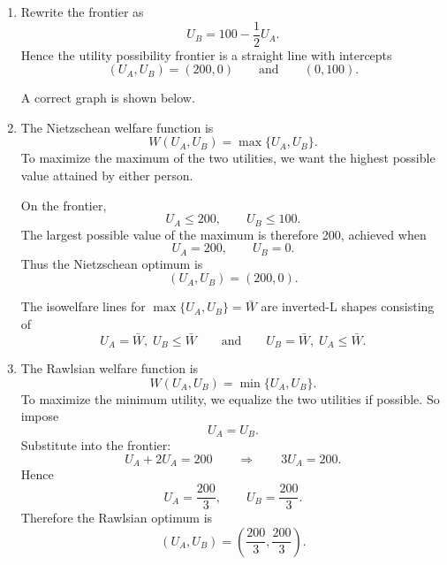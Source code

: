\documentclass[12pt]{article}
\begin{document}
\begin{enumerate}[label=(\alph*)]
    \item
    Rewrite the frontier as
    \[
    U_B = 100-\frac12 U_A.
    \]
    Hence the utility possibility frontier is a straight line with intercepts
    \[
    (U_A,U_B)=(200,0)
    \qquad\text{and}\qquad
    (0,100).
    \]

    A correct graph is shown below.

    \begin{center}
    \end{center}

    \item
    The Nietzschean welfare function is
    \[
    W(U_A,U_B)=\max\{U_A,U_B\}.
    \]
    To maximize the maximum of the two utilities, we want the highest possible value attained by either person.

    On the frontier,
    \[
    U_A\le 200,
    \qquad
    U_B\le 100.
    \]
    The largest possible value of the maximum is therefore 200, achieved when
    \[
    U_A=200,
    \qquad
    U_B=0.
    \]
    Thus the Nietzschean optimum is
    \[
    \boxed{(U_A,U_B)=(200,0).}
    \]

    The isowelfare lines for $\max\{U_A,U_B\}=\bar W$ are inverted-L shapes consisting of
    \[
    U_A=\bar W,\; U_B\le \bar W
    \qquad\text{and}\qquad
    U_B=\bar W,\; U_A\le \bar W.
    \]

    \item
    The Rawlsian welfare function is
    \[
    W(U_A,U_B)=\min\{U_A,U_B\}.
    \]
    To maximize the minimum utility, we equalize the two utilities if possible. So impose
    \[
    U_A=U_B.
    \]
    Substitute into the frontier:
    \[
    U_A+2U_A=200
    \qquad\Longrightarrow\qquad
    3U_A=200.
    \]
    Hence
    \[
    U_A=\frac{200}{3},
    \qquad
    U_B=\frac{200}{3}.
    \]
    Therefore the Rawlsian optimum is
    \[
    \boxed{\left(U_A,U_B\right)=\left(\frac{200}{3},\frac{200}{3}\right).}
    \]


\end{enumerate}
\end{document}

